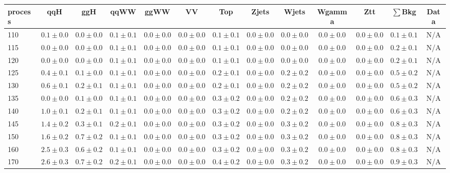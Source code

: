 \begin{table}
{%
 \tiny
 \begin{center}
 \begin{tabular}{l | c c | c c c c c c c c  | c c}
 \hline
 process & qqH & ggH & qqWW & ggWW & VV & Top & Zjets & Wjets & Wgamma & Ztt & $\sum$Bkg & Data \\
 \hline
110 & $0.1\pm0.0$ & $0.0\pm0.0$ & $0.1\pm0.1$ & $0.0\pm0.0$ & $0.0\pm0.0$ & $0.1\pm0.1$ & $0.0\pm0.0$ & $0.0\pm0.0$ & $0.0\pm0.0$ & $0.0\pm0.0$ & $0.1\pm0.1$ & N/A \\
115 & $0.0\pm0.0$ & $0.0\pm0.0$ & $0.1\pm0.1$ & $0.0\pm0.0$ & $0.0\pm0.0$ & $0.1\pm0.1$ & $0.0\pm0.0$ & $0.0\pm0.0$ & $0.0\pm0.0$ & $0.0\pm0.0$ & $0.2\pm0.1$ & N/A \\
120 & $0.0\pm0.0$ & $0.0\pm0.0$ & $0.1\pm0.1$ & $0.0\pm0.0$ & $0.0\pm0.0$ & $0.1\pm0.1$ & $0.0\pm0.0$ & $0.0\pm0.0$ & $0.0\pm0.0$ & $0.0\pm0.0$ & $0.2\pm0.1$ & N/A \\
125 & $0.4\pm0.1$ & $0.1\pm0.0$ & $0.1\pm0.1$ & $0.0\pm0.0$ & $0.0\pm0.0$ & $0.2\pm0.1$ & $0.0\pm0.0$ & $0.2\pm0.2$ & $0.0\pm0.0$ & $0.0\pm0.0$ & $0.5\pm0.2$ & N/A \\
130 & $0.6\pm0.1$ & $0.2\pm0.1$ & $0.1\pm0.1$ & $0.0\pm0.0$ & $0.0\pm0.0$ & $0.2\pm0.1$ & $0.0\pm0.0$ & $0.2\pm0.2$ & $0.0\pm0.0$ & $0.0\pm0.0$ & $0.5\pm0.2$ & N/A \\
135 & $0.0\pm0.0$ & $0.1\pm0.0$ & $0.1\pm0.1$ & $0.0\pm0.0$ & $0.0\pm0.0$ & $0.3\pm0.2$ & $0.0\pm0.0$ & $0.2\pm0.2$ & $0.0\pm0.0$ & $0.0\pm0.0$ & $0.6\pm0.3$ & N/A \\
140 & $1.0\pm0.1$ & $0.2\pm0.1$ & $0.1\pm0.1$ & $0.0\pm0.0$ & $0.0\pm0.0$ & $0.3\pm0.2$ & $0.0\pm0.0$ & $0.2\pm0.2$ & $0.0\pm0.0$ & $0.0\pm0.0$ & $0.6\pm0.3$ & N/A \\
145 & $1.4\pm0.2$ & $0.3\pm0.1$ & $0.2\pm0.1$ & $0.0\pm0.0$ & $0.0\pm0.0$ & $0.3\pm0.2$ & $0.0\pm0.0$ & $0.3\pm0.2$ & $0.0\pm0.0$ & $0.0\pm0.0$ & $0.8\pm0.3$ & N/A \\
150 & $1.6\pm0.2$ & $0.7\pm0.2$ & $0.1\pm0.1$ & $0.0\pm0.0$ & $0.0\pm0.0$ & $0.3\pm0.2$ & $0.0\pm0.0$ & $0.3\pm0.2$ & $0.0\pm0.0$ & $0.0\pm0.0$ & $0.8\pm0.3$ & N/A \\
160 & $2.5\pm0.3$ & $0.6\pm0.2$ & $0.1\pm0.1$ & $0.0\pm0.0$ & $0.0\pm0.0$ & $0.3\pm0.2$ & $0.0\pm0.0$ & $0.3\pm0.2$ & $0.0\pm0.0$ & $0.0\pm0.0$ & $0.8\pm0.3$ & N/A \\
170 & $2.6\pm0.3$ & $0.7\pm0.2$ & $0.2\pm0.1$ & $0.0\pm0.0$ & $0.0\pm0.0$ & $0.4\pm0.2$ & $0.0\pm0.0$ & $0.3\pm0.2$ & $0.0\pm0.0$ & $0.0\pm0.0$ & $0.9\pm0.3$ & N/A \\

\end{tabular}
\end{center}}
\end{table}
